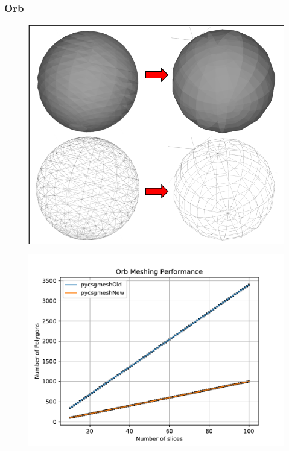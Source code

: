 \documentclass[12pt,a4paper]{article}
\begin{document}
\newpage
\subsubsection{Orb}

\begin{figure}[h!]
\centering
\begin{minipage}{.2\textwidth}
  \centering
  \includegraphics[height=0.8\linewidth]{Images//Meshes//orb.png}
  \label{fig:test1}
\end{minipage}%
\begin{minipage}{.3\textwidth}
  \centering
  \includegraphics[scale=0.35]{Images//Quad_fits//orb_quad.pdf}
  \label{fig:test2}
\end{minipage}%
\end{figure}
\end{document}
